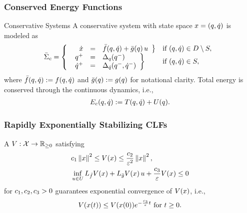 \begin{frame}[t]
  \frametitle{Conserved Energy Functions}
  \begin{block}{Conservative Systems}
    A conservative system with state space $x = (q, \dot q)$ is modeled as
    \begin{align*}
      \bar{\Sigma}_{c} = \left\{
      \begin{array}{l l}
        \left.\begin{array}{r c l}
          \hspace{.58em}\dot{x} &=& {\bar {f}}(q, \dot q) + {\bar {g}}(q) \, u
        \end{array}\right\}  & \mbox{if } (q, \dot q) \in D \setminus S,\\
        \left. \begin{array}{r c l}
          q^{+} &=& \Delta_{q}(q^{-})\\
          \dot q^{+} &=& \Delta_{\dot q}(q^{-}, \dot q^{-})
        \end{array} \right\} & \mbox{if } (q, \dot q) \in S,
      \end{array}\right.
    \end{align*}
    where ${\bar {f}}(q, \dot q) := f(q, \dot q)$ and ${\bar {g}}(q) := g(q)$ for
    notational clarity. Total energy is conserved through the continuous
    dynamics, i.e.,
    \begin{align*}
      E_{c}(q, \dot q) := T(q, \dot q) + U(q).
    \end{align*}
  \end{block}
\end{frame}

\begin{frame}[t]
  \frametitle{Rapidly Exponentially Stabilizing CLFs}
  A 
  $V : \mathcal{X} \to \mathbb{R}_{\geq 0}$ satisfying
  \begin{align*}
    &c_{1} \left\|x\right\|^{2} \leq V(x) \leq \frac{c_{2}}{\varepsilon^{2}} \left\|x\right\|^{2},\\
    &\inf_{u \in U} L_{{\bar {f}}}V(x) + L_{{\bar {g}}}V(x) \, u +
    \frac{c_{3}}{\varepsilon} V(x) \leq 0
  \end{align*}
  for $c_{1}, c_{2}, c_{3} > 0$ guarantees exponential convergence of $V(x)$, i.e.,
  \begin{align*}
    V(x(t)) \leq V(x(0)) e^{-\frac{c_{3}}{\varepsilon} t} \mbox{ for } t \geq 0.
  \end{align*}
\end{frame}

